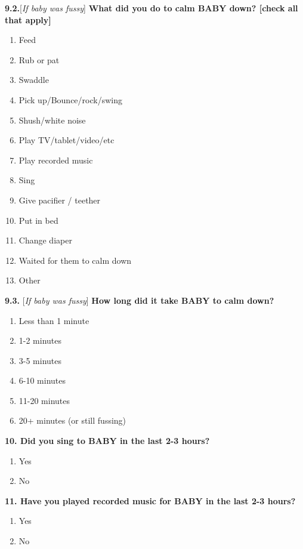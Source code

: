 \documentclass[
]{article}
\providecommand{\tightlist}{%
  \setlength{\itemsep}{0pt}\setlength{\parskip}{0pt}}
\begin{document}
\textbf{9.2.}{[}\emph{If baby was fussy}{]} \textbf{What did you do to
calm BABY down? {[}check all that apply{]}}

\begin{enumerate}
\def\labelenumi{\alph{enumi}.}
\tightlist
\item
  Feed
\item
  Rub or pat
\item
  Swaddle
\item
  Pick up/Bounce/rock/swing
\item
  Shush/white noise
\item
  Play TV/tablet/video/etc
\item
  Play recorded music
\item
  Sing
\item
  Give pacifier / teether
\item
  Put in bed
\item
  Change diaper
\item
  Waited for them to calm down
\item
  Other
\end{enumerate}

\textbf{9.3.} {[}\emph{If baby was fussy}{]} \textbf{How long did it
take BABY to calm down?}

\begin{enumerate}
\def\labelenumi{\alph{enumi}.}
\tightlist
\item
  Less than 1 minute
\item
  1-2 minutes
\item
  3-5 minutes
\item
  6-10 minutes
\item
  11-20 minutes
\item
  20+ minutes (or still fussing)
\end{enumerate}

\textbf{10. Did you sing to BABY in the last 2-3 hours?}

\begin{enumerate}
\def\labelenumi{\alph{enumi}.}
\tightlist
\item
  Yes
\item
  No
\end{enumerate}

\textbf{11. Have you played recorded music for BABY in the last 2-3
hours?}

\begin{enumerate}
\def\labelenumi{\alph{enumi}.}
\tightlist
\item
  Yes
\item
  No
\end{enumerate}
\end{document}
